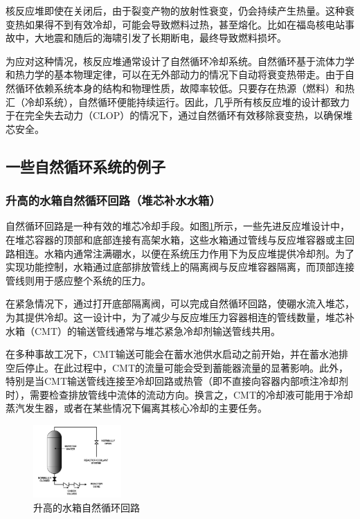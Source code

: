 \documentclass{article}
\begin{document}
核反应堆即使在关闭后，由于裂变产物的放射性衰变，仍会持续产生热量。这种衰变热如果得不到有效冷却，可能会导致燃料过热，甚至熔化。比如在福岛核电站事故中，大地震和随后的海啸引发了长期断电，最终导致燃料损坏。

为应对这种情况，核反应堆通常设计了自然循环冷却系统。自然循环基于流体力学和热力学的基本物理定律，可以在无外部动力的情况下自动将衰变热带走。由于自然循环依赖系统本身的结构和物理性质，故障率较低。只要存在热源（燃料）和热汇（冷却系统），自然循环便能持续运行。因此，几乎所有核反应堆的设计都致力于在完全失去动力（CLOP）的情况下，通过自然循环有效移除衰变热，以确保堆芯安全。

\subsection{一些自然循环系统的例子}

\subsubsection{升高的水箱自然循环回路（堆芯补水水箱）}

自然循环回路是一种有效的堆芯冷却手段。如图\ref{fig:upward-tank}所示，一些先进反应堆设计中，在堆芯容器的顶部和底部连接有高架水箱，这些水箱通过管线与反应堆容器或主回路相连。水箱内通常注满硼水，以便在系统压力作用下为反应堆提供冷却剂。为了实现功能控制，水箱通过底部排放管线上的隔离阀与反应堆容器隔离，而顶部连接管线则用于感应整个系统的压力。

在紧急情况下，通过打开底部隔离阀，可以完成自然循环回路，使硼水流入堆芯，为其提供冷却。这一设计中，为了减少与反应堆压力容器相连的管线数量，堆芯补水箱（CMT）的输送管线通常与堆芯紧急冷却剂输送管线共用。

在多种事故工况下，CMT输送可能会在蓄水池供水启动之前开始，并在蓄水池排空后停止。在此过程中，CMT的流量可能会受到蓄能器流量的显著影响。此外，特别是当CMT输送管线连接至冷却回路或热管（即不直接向容器内部喷注冷却剂时），需要检查排放管线中流体的流动方向。换言之，CMT的冷却液可能用于冷却蒸汽发生器，或者在某些情况下偏离其核心冷却的主要任务。\cite{international2009iaea}

\begin{figure}[htbp]
    \centering
    \includegraphics[width=0.3\textwidth]{figures/upward-tank.png}
    \caption{升高的水箱自然循环回路}
    \label{fig:upward-tank}
\end{figure}
\end{document}
